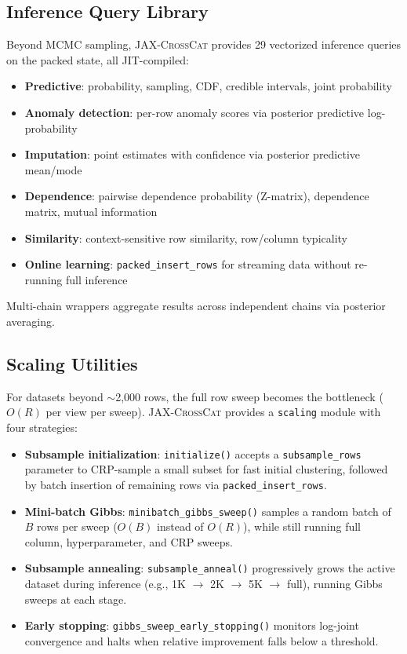 \documentclass[11pt]{article}
\newcommand{\jaxcc}{\textsc{JAX-CrossCat}}
\begin{document}
\subsection{Inference Query Library}

Beyond MCMC sampling, \jaxcc{} provides 29 vectorized inference queries
on the packed state, all JIT-compiled:

\begin{itemize}
  \item \textbf{Predictive}: probability, sampling, CDF, credible
    intervals, joint probability
  \item \textbf{Anomaly detection}: per-row anomaly scores via posterior
    predictive log-probability
  \item \textbf{Imputation}: point estimates with confidence via
    posterior predictive mean/mode
  \item \textbf{Dependence}: pairwise dependence probability (Z-matrix),
    dependence matrix, mutual information
  \item \textbf{Similarity}: context-sensitive row similarity,
    row/column typicality
  \item \textbf{Online learning}: \texttt{packed\_insert\_rows} for
    streaming data without re-running full inference
\end{itemize}

Multi-chain wrappers aggregate results across independent chains via
posterior averaging.

\subsection{Scaling Utilities}

For datasets beyond ${\sim}$2,000 rows, the full row sweep becomes the
bottleneck ($O(R)$ per view per sweep). \jaxcc{} provides a
\texttt{scaling} module with four strategies:

\begin{itemize}
  \item \textbf{Subsample initialization}: \texttt{initialize()} accepts a
    \texttt{subsample\_rows} parameter to CRP-sample a small subset for
    fast initial clustering, followed by batch insertion of remaining rows
    via \texttt{packed\_insert\_rows}.
  \item \textbf{Mini-batch Gibbs}: \texttt{minibatch\_gibbs\_sweep()}
    samples a random batch of $B$ rows per sweep ($O(B)$ instead of
    $O(R)$), while still running full column, hyperparameter, and CRP
    sweeps.
  \item \textbf{Subsample annealing}: \texttt{subsample\_anneal()}
    progressively grows the active dataset during inference (e.g., 1K
    $\to$ 2K $\to$ 5K $\to$ full), running Gibbs sweeps at each stage.
  \item \textbf{Early stopping}: \texttt{gibbs\_sweep\_early\_stopping()}
    monitors log-joint convergence and halts when relative improvement
    falls below a threshold.
\end{itemize}
\end{document}
